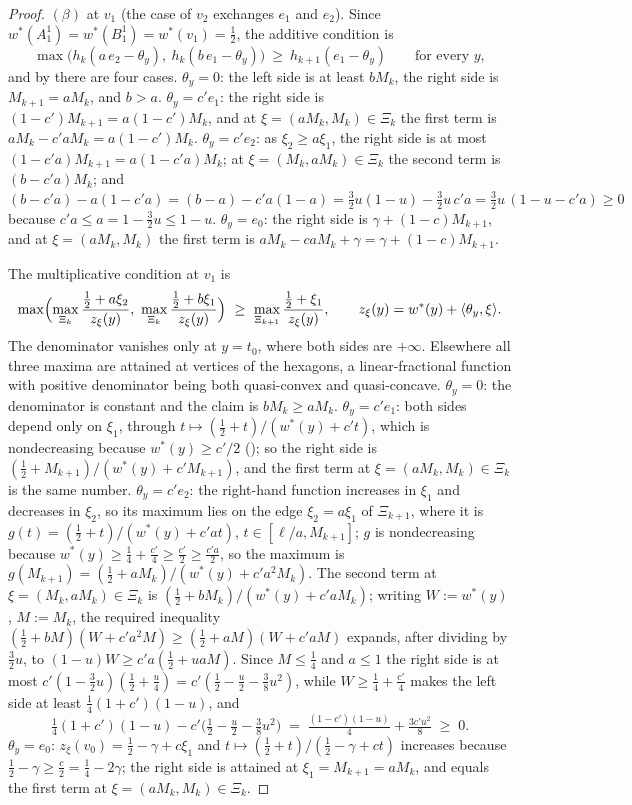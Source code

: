 \documentclass[11pt]{article}
\theoremstyle{plain}
\theoremstyle{definition}
\begin{document}
\begin{proof}
$(\beta)$ at $v_1$ (the case of $v_2$ exchanges $e_1$ and $e_2$). Since
$w^\ast(A^{1}_1)=w^\ast(B^{1}_1)=w^\ast(v_1)=\tfrac12$, the additive
condition is
\[
  \max\bigl(h_k(a\,e_2-\theta_y),\ h_k(b\,e_1-\theta_y)\bigr)\ \ge\
  h_{k+1}(e_1-\theta_y)\qquad\text{for every }y,
\]
and by  there are four cases.
\emph{$\theta_y=0$}: the left side is at least $bM_k$, the right side is
$M_{k+1}=aM_k$, and $b>a$.
\emph{$\theta_y=c'e_1$}: the right side is $(1-c')M_{k+1}=a(1-c')M_k$,
and at $\xi=(aM_k,M_k)\in\Xi_k$ the first term is
$aM_k-c'aM_k=a(1-c')M_k$.
\emph{$\theta_y=c'e_2$}: as $\xi_2\ge a\xi_1$, the right side is at most
$(1-c'a)M_{k+1}=a(1-c'a)M_k$; at $\xi=(M_k,aM_k)\in\Xi_k$ the second term
is $(b-c'a)M_k$; and
$(b-c'a)-a(1-c'a)=(b-a)-c'a(1-a)=\tfrac32u(1-u)-\tfrac32u\,c'a
=\tfrac32u\,(1-u-c'a)\ge0$ because $c'a\le a=1-\tfrac32u\le1-u$.
\emph{$\theta_y=e_0$}: the right side is $\gamma+(1-c)M_{k+1}$, and at
$\xi=(aM_k,M_k)$ the first term is $aM_k-caM_k+\gamma=\gamma+(1-c)M_{k+1}$.

The multiplicative condition at $v_1$ is
\[
  \max\Bigl(\max_{\Xi_k}\frac{\tfrac12+a\xi_2}{z_\xi(y)},\
  \max_{\Xi_k}\frac{\tfrac12+b\xi_1}{z_\xi(y)}\Bigr)\ \ge\
  \max_{\Xi_{k+1}}\frac{\tfrac12+\xi_1}{z_\xi(y)},\qquad
  z_\xi(y)=w^\ast(y)+\langle\theta_y,\xi\rangle .
\]
The denominator vanishes only at $y=t_0$, where both sides are $+\infty$.
Elsewhere all three maxima are attained at vertices of the hexagons, a
linear-fractional function with positive denominator being both
quasi-convex and quasi-concave.
\emph{$\theta_y=0$}: the denominator is constant and the claim is
$bM_k\ge aM_k$.
\emph{$\theta_y=c'e_1$}: both sides depend only on $\xi_1$, through
$t\mapsto(\tfrac12+t)/(w^\ast(y)+c't)$, which is nondecreasing because
$w^\ast(y)\ge c'/2$ (); so the right side is
$(\tfrac12+M_{k+1})/(w^\ast(y)+c'M_{k+1})$, and the first term at
$\xi=(aM_k,M_k)\in\Xi_k$ is the same number.
\emph{$\theta_y=c'e_2$}: the right-hand function increases in $\xi_1$ and
decreases in $\xi_2$, so its maximum lies on the edge $\xi_2=a\xi_1$ of
$\Xi_{k+1}$, where it is $g(t)=(\tfrac12+t)/(w^\ast(y)+c'at)$,
$t\in[\ell/a,M_{k+1}]$; $g$ is nondecreasing because
$w^\ast(y)\ge\tfrac14+\tfrac{c'}4\ge\tfrac{c'}2\ge\tfrac{c'a}2$, so the
maximum is $g(M_{k+1})=(\tfrac12+aM_k)/(w^\ast(y)+c'a^{2}M_k)$. The
second term at $\xi=(M_k,aM_k)\in\Xi_k$ is
$(\tfrac12+bM_k)/(w^\ast(y)+c'aM_k)$; writing $W:=w^\ast(y)$, $M:=M_k$,
the required inequality
$(\tfrac12+bM)(W+c'a^{2}M)\ge(\tfrac12+aM)(W+c'aM)$ expands, after
dividing by $\tfrac32u$, to $(1-u)W\ge c'a(\tfrac12+uaM)$. Since
$M\le\tfrac14$ and $a\le1$ the right side is at most
$c'(1-\tfrac32u)(\tfrac12+\tfrac u4)=c'(\tfrac12-\tfrac u2-\tfrac38u^{2})$,
while $W\ge\tfrac14+\tfrac{c'}4$ makes the left side at least
$\tfrac14(1+c')(1-u)$, and
\[
  \tfrac14(1+c')(1-u)-c'\bigl(\tfrac12-\tfrac u2-\tfrac38u^{2}\bigr)
  \;=\;\tfrac{(1-c')(1-u)}4+\tfrac{3c'u^{2}}8\;\ge\;0 .
\]
\emph{$\theta_y=e_0$}: $z_\xi(v_0)=\tfrac12-\gamma+c\xi_1$ and
$t\mapsto(\tfrac12+t)/(\tfrac12-\gamma+ct)$ increases because
$\tfrac12-\gamma\ge\tfrac c2=\tfrac14-2\gamma$; the right side is
attained at $\xi_1=M_{k+1}=aM_k$, and equals the first term at
$\xi=(aM_k,M_k)\in\Xi_k$.


\end{proof}
\end{document}
